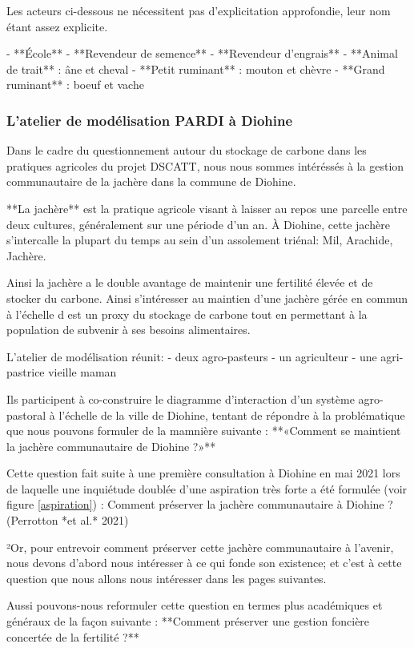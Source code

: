 Les acteurs ci-dessous ne nécessitent pas d'explicitation approfondie, leur nom étant assez explicite.

- **École**
- **Revendeur de semence**
- **Revendeur d'engrais**
- **Animal de trait** : âne et cheval
- **Petit ruminant** : mouton et chèvre
- **Grand ruminant** : boeuf et vache

\subsubsection{L'atelier de modélisation PARDI à Diohine }

Dans le cadre du questionnement autour du stockage de carbone dans les pratiques agricoles du projet DSCATT, nous nous sommes intéréssés à la gestion communautaire de la jachère dans la commune de Diohine. 

**La jachère** est la pratique agricole visant à laisser au repos une parcelle entre deux cultures, généralement sur une période d'un an. À Diohine, cette jachère s'intercalle la plupart du temps au sein d'un assolement triénal: Mil, Arachide, Jachère.

Ainsi la jachère a le double avantage de maintenir une fertilité élevée et de stocker du carbone. Ainsi s'intéresser au maintien d'une jachère gérée en commun à l'échelle d est un proxy du stockage de carbone tout en permettant à la population de subvenir à ses besoins alimentaires.

L'atelier de modélisation réunit:
- deux agro-pasteurs
- un agriculteur
- une agri-pastrice vieille maman 

Ils participent à co-construire le diagramme d'interaction d'un système agro-pastoral à l'échelle de la ville de Diohine, tentant de répondre à la problématique que nous pouvons formuler de la mamnière suivante : **«Comment se maintient la jachère communautaire de Diohine ?»**

Cette question fait suite à une première consultation à Diohine en mai 2021 lors de laquelle une inquiétude doublée d'une aspiration très forte a été formulée (voir figure \ref{aspiration}) : Comment préserver la jachère communautaire à Diohine ? (Perrotton *et al.* 2021) 

²Or, pour entrevoir comment préserver cette jachère communautaire à l'avenir, nous devons d'abord nous intéresser à ce qui fonde son existence; et c'est à cette question que nous allons nous intéresser dans les pages suivantes. 


Aussi pouvons-nous reformuler cette question en termes plus académiques et généraux de la façon suivante :  
**Comment préserver une gestion foncière concertée de la fertilité ?**

